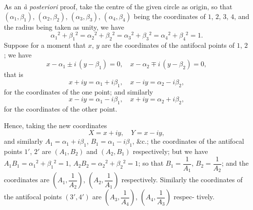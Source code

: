\documentclass[11pt,a4paper]{article}
\begin{document}
As an \textit{\`{a} posteriori} proof, take the centre of the given circle as origin, so that
$(\alpha_1, \beta_1)$, $(\alpha_2, \beta_2)$, $(\alpha_3, \beta_3)$, $(\alpha_4, \beta_4)$ being the coordinates of $1$, $2$, $3$, $4$, and the radius
being taken as unity, we have
\[
\alpha_1{}^2 + \beta_1{}^2 = \alpha_2{}^2 + \beta_2{}^2 = \alpha_3{}^2 + \beta_3{}^2 = \alpha_4{}^2 + \beta_4{}^2 = 1.
\]
Suppose for a moment that $x$, $y$ are the coordinates of the antifocal points of $1$, $2$; we
have
\[
x - \alpha_1 \pm i\,(y - \beta_1) = 0, \quad x - \alpha_2 \mp i\,(y - \beta_2) = 0,
\]
that is
\[
x + iy = \alpha_1 + i\beta_1, \quad x - iy = \alpha_2 - i\beta_2,
\]
for the coordinates of the one point; and similarly
\[
x - iy = \alpha_1 - i\beta_1, \quad x + iy = \alpha_2 + i\beta_2,
\]
for the coordinates of the other point.

Hence, taking the new coordinates
\[
X = x + iy, \quad Y = x - iy,
\]
and similarly $A_1 = \alpha_1 + i\beta_1$, $B_1 = \alpha_1 - i\beta_1$, \&c.; the coordinates of the antifocal points $1'$, $2'$
are $(A_1, B_2)$ and $(A_2, B_1)$ respectively; but we have $A_1B_1 = \alpha_1{}^2 + \beta_1{}^2 = 1$, $A_2B_2 = \alpha_2{}^2 + \beta_2{}^2 = 1$;
so that $B_1 = \dfrac{1}{A_1}$, $B_2 = \dfrac{1}{A_2}$; and the coordinates are $\left(A_1, \dfrac{1}{A_2}\right)$, $\left(A_2, \dfrac{1}{A_1}\right)$ respectively.
Similarly the coordinates of the antifocal points $(3', 4')$ are $\left(A_3, \dfrac{1}{A_4}\right)$, $\left(A_4, \dfrac{1}{A_3}\right)$ respec-
\noindent tively.
\end{document}
